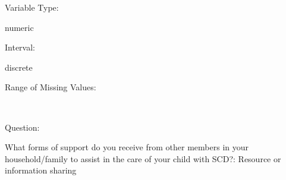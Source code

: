 \documentclass[
]{article}
\begin{document}
\begin{minipage}[t]{0.3\linewidth}

Variable Type:

\end{minipage}%
\begin{minipage}[t]{0.7\linewidth}

numeric

\end{minipage}

\begin{minipage}[t]{0.3\linewidth}

Interval:

\end{minipage}%
\begin{minipage}[t]{0.7\linewidth}

discrete

\end{minipage}

\begin{minipage}[t]{0.3\linewidth}

Range of Missing Values:

\end{minipage}%
\begin{minipage}[t]{0.7\linewidth}

~

\end{minipage}

\begin{minipage}[t]{0.3\linewidth}

Question:

\end{minipage}%
\begin{minipage}[t]{0.7\linewidth}

What forms of support do you receive from other members in your
household/family to assist in the care of your child with SCD?: Resource
or information sharing

\end{minipage}
\end{document}
